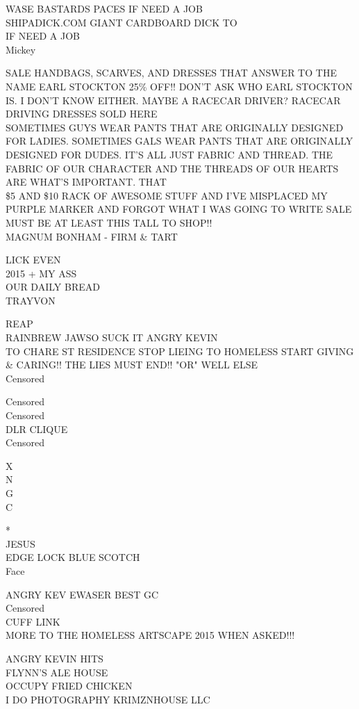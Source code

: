 \documentclass[10pt,letterpaper]{article}
\begin{document}
WASE BASTARDS PACES IF NEED A JOB\\
SHIPADICK.COM GIANT CARDBOARD DICK TO\\
IF NEED A JOB\\
Mickey

SALE HANDBAGS, SCARVES, AND DRESSES THAT ANSWER TO THE NAME EARL STOCKTON 25\% OFF!!  DON'T ASK WHO EARL STOCKTON IS.  I DON'T KNOW EITHER.  MAYBE A RACECAR DRIVER?  RACECAR DRIVING DRESSES SOLD HERE\\
SOMETIMES GUYS WEAR PANTS THAT ARE ORIGINALLY DESIGNED FOR LADIES.  SOMETIMES GALS WEAR PANTS THAT ARE ORIGINALLY DESIGNED FOR DUDES.  IT'S ALL JUST FABRIC AND THREAD.  THE FABRIC OF OUR CHARACTER AND THE THREADS OF OUR HEARTS ARE WHAT'S IMPORTANT.  THAT\\
\$5 AND \$10 RACK OF AWESOME STUFF AND I'VE MISPLACED MY PURPLE MARKER AND FORGOT WHAT I WAS GOING TO WRITE SALE MUST BE AT LEAST THIS TALL TO SHOP!!\\
MAGNUM BONHAM {-} FIRM \& TART

LICK EVEN\\
2015 + MY ASS\\
OUR DAILY BREAD\\
TRAYVON

REAP\\
RAINBREW JAWSO SUCK IT ANGRY KEVIN\\
TO CHARE ST RESIDENCE STOP LIEING TO HOMELESS START GIVING \& CARING!! THE LIES MUST END!! "OR" WELL ELSE\\
Censored

Censored\\
Censored\\
DLR CLIQUE\\
Censored

X\\
N\\
G\\
C

*\\
JESUS\\
EDGE LOCK BLUE SCOTCH\\
Face

ANGRY KEV EWASER BEST GC\\
Censored\\
CUFF LINK\\
MORE TO THE HOMELESS ARTSCAPE 2015 WHEN ASKED!!!

ANGRY KEVIN HITS\\
FLYNN'S ALE HOUSE\\
OCCUPY FRIED CHICKEN\\
I DO PHOTOGRAPHY KRIMZNHOUSE LLC
\end{document}
